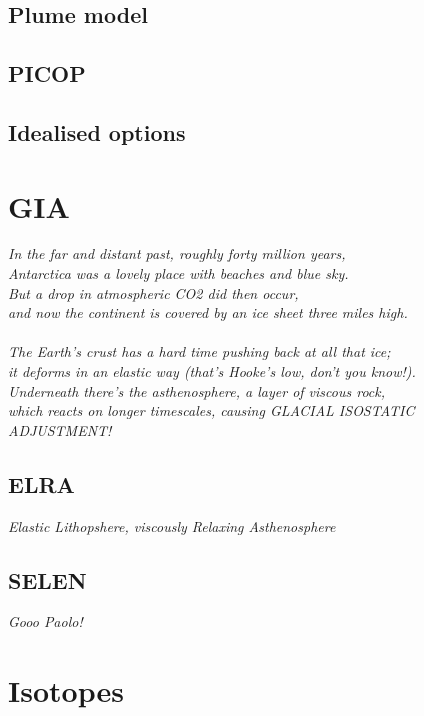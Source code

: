 \documentclass{article}
\begin{document}
\subsection{Plume model}

\subsection{PICOP}

\subsection{Idealised options}

\newpage
\section{GIA}

\textit{In the far and distant past, roughly forty million years,\\
Antarctica was a lovely place with beaches and blue sky.\\
But a drop in atmospheric CO2 did then occur,\\
and now the continent is covered by an ice sheet three miles high.\\
\\
The Earth's crust has a hard time pushing back at all that ice;\\
it deforms in an elastic way (that's Hooke's low, don't you know!).\\
Underneath there's the asthenosphere, a layer of viscous rock,\\
which reacts on longer timescales, causing GLACIAL ISOSTATIC ADJUSTMENT!}

\subsection{ELRA}

\textit{Elastic Lithopshere, viscously Relaxing Asthenosphere}

\subsection{SELEN}

\textit{Gooo Paolo!}

\newpage
\section{Isotopes}
\end{document}
